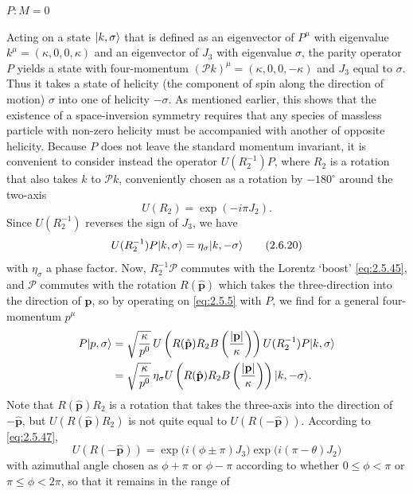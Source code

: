 \medskip
\noindent\textbf{$P:M=0$}

Acting on a state $\lvert k,\sigma\rangle$ that is defined as an eigenvector of
$P^\mu$ with eigenvalue $k^\mu=(\kappa,0,0,\kappa)$ and an eigenvector of
$J_3$ with eigenvalue $\sigma$, the parity operator $P$ yields a state with
four-momentum $(\mathcal{P}k)^\mu=(\kappa,0,0,-\kappa)$ and $J_3$ equal to
$\sigma$. Thus it takes a state of helicity (the component of spin along the
direction of motion) $\sigma$ into one of helicity $-\sigma$. As mentioned
earlier, this shows that the existence of a space-inversion symmetry requires
that any species of massless particle with non-zero helicity must be
accompanied with another of opposite helicity. Because $P$ does not leave the
standard momentum invariant, it is convenient to consider instead the
operator $U(R_2^{-1})P$, where $R_2$ is a rotation that also takes $k$ to
$\mathcal{P}k$, conveniently chosen as a rotation by $-180^\circ$ around the
two-axis
\begin{equation}
U(R_2)=\exp(-i\pi J_2).
\tag{2.6.19}\label{eq:2.6.19}
\end{equation}
Since $U(R_2^{-1})$ reverses the sign of $J_3$, we have
\begin{equation}
U(R_2^{-1})P\lvert k,\sigma\rangle=\eta_\sigma\lvert k,-\sigma\rangle
\tag{2.6.20}\label{eq:2.6.20}
\end{equation}
with $\eta_\sigma$ a phase factor. Now, $R_2^{-1}\mathcal{P}$ commutes with the
Lorentz `boost' \eqref{eq:2.5.45}, and $\mathcal{P}$ commutes with the rotation
$R(\hat{\mathbf{p}})$ which takes the three-direction into the direction of
$\mathbf{p}$, so by operating on \eqref{eq:2.5.5} with $P$, we find for a general
four-momentum $p^\mu$
\[
\begin{aligned}
P\lvert p,\sigma\rangle
&=\sqrt{\frac{\kappa}{p^0}}\,
U\left(R(\hat{\mathbf{p}})R_2B\left(\frac{|\mathbf{p}|}{\kappa}\right)\right)
U(R_2^{-1})P\lvert k,\sigma\rangle\\
&=\sqrt{\frac{\kappa}{p^0}}\,\eta_\sigma
U\left(R(\hat{\mathbf{p}})R_2B\left(\frac{|\mathbf{p}|}{\kappa}\right)\right)
\lvert k,-\sigma\rangle.
\end{aligned}
\]
Note that $R(\hat{\mathbf{p}})R_2$ is a rotation that takes the three-axis into
the direction of $-\hat{\mathbf{p}}$, but
$U(R(\hat{\mathbf{p}})R_2)$ is not quite equal to
$U(R(-\hat{\mathbf{p}}))$. According to \eqref{eq:2.5.47},
\[
U(R(-\hat{\mathbf{p}}))
=\exp\bigl(i(\phi\pm\pi)J_3\bigr)
 \exp\bigl(i(\pi-\theta)J_2\bigr)
\]
with azimuthal angle chosen as $\phi+\pi$ or $\phi-\pi$ according to whether
$0\leq\phi<\pi$ or $\pi\leq\phi<2\pi$, so that it remains in the range of
